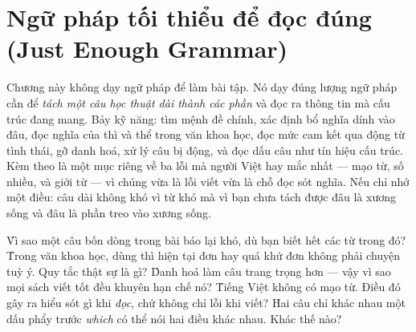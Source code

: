\documentclass[../../english.tex]{subfiles}
\begin{document}
\chapter{Ngữ pháp tối thiểu để đọc đúng (Just Enough Grammar)}

\begin{tomtat}
Chương này không dạy ngữ pháp để làm bài tập. Nó dạy đúng lượng ngữ pháp cần để \emph{tách một câu học thuật dài thành các phần} và đọc ra thông tin mà cấu trúc đang mang. Bảy kỹ năng: tìm mệnh đề chính, xác định bổ nghĩa dính vào đâu, đọc nghĩa của thì và thể trong văn khoa học, đọc mức cam kết qua động từ tình thái, gỡ danh hoá, xử lý câu bị động, và đọc dấu câu như tín hiệu cấu trúc. Kèm theo là một mục riêng về ba lỗi mà người Việt hay mắc nhất --- mạo từ, số nhiều, và giới từ --- vì chúng vừa là lỗi viết vừa là chỗ đọc sót nghĩa. Nếu chỉ nhớ một điều: câu dài không khó vì từ khó mà vì bạn chưa tách được đâu là xương sống và đâu là phần treo vào xương sống.
\end{tomtat}

\begin{nentang}
\end{nentang}

\begin{khoigoi}
\h{Vì sao một câu bốn dòng trong bài báo lại khó, dù bạn biết hết các từ trong đó?}
\h{Trong văn khoa học, dùng thì hiện tại đơn hay quá khứ đơn không phải chuyện tuỳ ý. Quy tắc thật sự là gì?}
\h{Danh hoá làm câu trang trọng hơn --- vậy vì sao mọi sách viết tốt đều khuyên hạn chế nó?}
\h{Tiếng Việt không có mạo từ. Điều đó gây ra hiểu sót gì khi \emph{đọc}, chứ không chỉ lỗi khi viết?}
\h{Hai câu chỉ khác nhau một dấu phẩy trước \emph{which} có thể nói hai điều khác nhau. Khác thế nào?}
\end{khoigoi}
\end{document}
